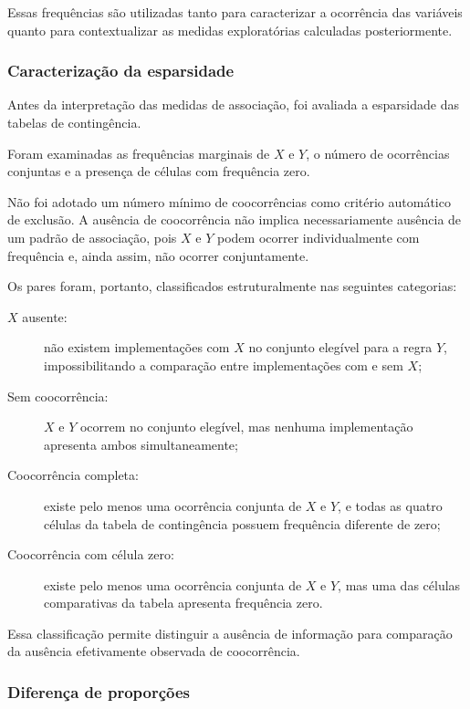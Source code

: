 Essas frequências são utilizadas tanto para caracterizar a ocorrência
das variáveis quanto para contextualizar as medidas exploratórias
calculadas posteriormente.

\subsubsection{Caracterização da esparsidade}

Antes da interpretação das medidas de associação, foi avaliada a
esparsidade das tabelas de contingência.

Foram examinadas as frequências marginais de $X$ e $Y$, o número de
ocorrências conjuntas e a presença de células com frequência zero.

Não foi adotado um número mínimo de coocorrências como critério
automático de exclusão. A ausência de coocorrência não implica
necessariamente ausência de um padrão de associação, pois $X$ e $Y$
podem ocorrer individualmente com frequência e, ainda assim, não
ocorrer conjuntamente.

Os pares foram, portanto, classificados estruturalmente nas seguintes
categorias:

\begin{description}

    \item[$X$ ausente:]
    não existem implementações com $X$ no conjunto elegível para a
    regra $Y$, impossibilitando a comparação entre implementações com
    e sem $X$;

    \item[Sem coocorrência:]
    $X$ e $Y$ ocorrem no conjunto elegível, mas nenhuma implementação
    apresenta ambos simultaneamente;

    \item[Coocorrência completa:]
    existe pelo menos uma ocorrência conjunta de $X$ e $Y$, e todas
    as quatro células da tabela de contingência possuem frequência
    diferente de zero;

    \item[Coocorrência com célula zero:]
    existe pelo menos uma ocorrência conjunta de $X$ e $Y$, mas uma
    das células comparativas da tabela apresenta frequência zero.

\end{description}

Essa classificação permite distinguir a ausência de informação para
comparação da ausência efetivamente observada de coocorrência.

\subsubsection{Diferença de proporções}

